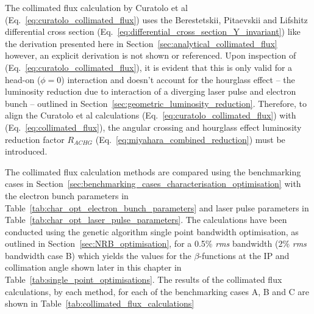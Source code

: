 \documentclass[../main.tex]{subfiles}
\begin{document}
The collimated flux calculation by Curatolo et al \cite{curatolo2017analytical} (Eq.~\ref{eq:curatolo_collimated_flux}) uses the Berestetskii, Pitaevskii and Lifshitz \cite{berestetskii1982quantum} differential cross section (Eq.~\ref{eq:differential_cross_section_Y_invariant}) like the derivation presented here in Section~\ref{sec:analytical_collimated_flux} however, an explicit derivation is not shown or referenced. Upon inspection of (Eq.~\ref{eq:curatolo_collimated_flux}), it is evident that this is only valid for a head-on ($\phi=0$) interaction and doesn't account for the  hourglass effect \cite{furman1991hourglass,miyahara2008luminosity} -- the luminosity reduction due to interaction of a diverging laser pulse and electron bunch -- outlined in Section~\ref{sec:geometric_luminosity_reduction}. Therefore, to align the Curatolo et al calculations (Eq.~\ref{eq:curatolo_collimated_flux}) with (Eq.~\ref{eq:collimated_flux}), the angular crossing and hourglass effect luminosity reduction factor $R_{ACHG}$ \cite{miyahara2008luminosity} (Eq.~\ref{eq:miyahara_combined_reduction}) must be introduced.

The collimated flux calculation methods are compared using the benchmarking cases in Section~\ref{sec:benchmarking_cases_characterisation_optimisation} with the electron bunch parameters in Table~\ref{tab:char_opt_electron_bunch_parameters} and laser pulse parameters in Table~\ref{tab:char_opt_laser_pulse_parameters}. The calculations have been conducted using the genetic algorithm single point bandwidth optimisation, as outlined in Section~\ref{sec:NRB_optimisation}, for a 0.5\% \textit{rms} bandwidth (2\% \textit{rms} bandwidth case B) which yields the values for the $\beta$-functions at the IP and collimation angle shown later in this chapter in Table~\ref{tab:single_point_optimisations}. The results of the collimated flux calculations, by each method, for each of the benchmarking cases A, B and C are shown in Table~\ref{tab:collimated_flux_calculations}
\end{document}
